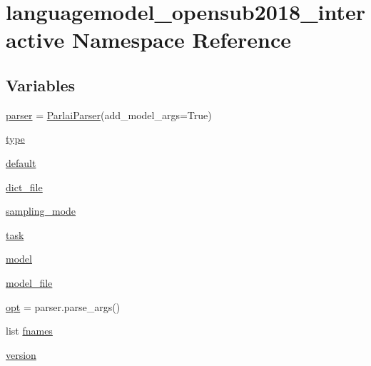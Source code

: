 \hypertarget{namespacelanguagemodel__opensub2018__interactive}{}\section{languagemodel\+\_\+opensub2018\+\_\+interactive Namespace Reference}
\label{namespacelanguagemodel__opensub2018__interactive}
\subsection*{Variables}
\begin{DoxyCompactItemize}
\item 
\hyperlink{namespacelanguagemodel__opensub2018__interactive_aafed68cdf8fff6474b2b1959df50c87c}{parser} = \hyperlink{classparlai_1_1core_1_1params_1_1ParlaiParser}{Parlai\+Parser}(add\+\_\+model\+\_\+args=True)
\item 
\hyperlink{namespacelanguagemodel__opensub2018__interactive_a1dda4cab66b2279fcd947067fa6ab922}{type}
\item 
\hyperlink{namespacelanguagemodel__opensub2018__interactive_a487a7a053ac9ce20e4dedc8d5a0641a9}{default}
\item 
\hyperlink{namespacelanguagemodel__opensub2018__interactive_ab54d95e246e5287536a4de0330daf9b5}{dict\+\_\+file}
\item 
\hyperlink{namespacelanguagemodel__opensub2018__interactive_a759a5c6eda6c2d9e04ac82077b60aa54}{sampling\+\_\+mode}
\item 
\hyperlink{namespacelanguagemodel__opensub2018__interactive_af4f35bc41571ec67cfaea7419c8ca155}{task}
\item 
\hyperlink{namespacelanguagemodel__opensub2018__interactive_a1fe29f10645bd0c038c71791d07badb0}{model}
\item 
\hyperlink{namespacelanguagemodel__opensub2018__interactive_acf106ae9faa31dc9eec9b66a414dff8b}{model\+\_\+file}
\item 
\hyperlink{namespacelanguagemodel__opensub2018__interactive_a093f67e7f82ac2ec567fe9bb6c0550db}{opt} = parser.\+parse\+\_\+args()
\item 
list \hyperlink{namespacelanguagemodel__opensub2018__interactive_a4ea99fb861f52a503971981a4a847895}{fnames}
\item 
\hyperlink{namespacelanguagemodel__opensub2018__interactive_a5f07f4c770fe7191e65b88c33e0b61ab}{version}
\end{DoxyCompactItemize}


